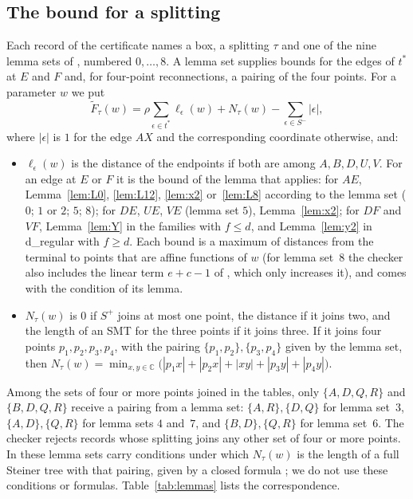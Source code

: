 \documentclass[11pt]{amsart}
\theoremstyle{definition}
\theoremstyle{remark}
\numberwithin{equation}{section}
\begin{document}
\subsection{The bound for a splitting}\label{sec:bound}
Each record of the certificate names a box, a splitting $\tau$ and one of the nine lemma sets of \cite{KHSHGW}, numbered $0,\dots,8$. A lemma set supplies bounds for the edges of $t^*$ at $E$ and $F$ and, for four-point reconnections, a pairing of the four points. For a parameter $w$ we put
\[
\tilde F_\tau(w)=\rho\sum_{\epsilon\in t^*}\ell_\epsilon(w)+N_\tau(w)-\sum_{\epsilon\in S^-}|\epsilon|,
\]
where $|\epsilon|$ is $1$ for the edge $AX$ and the corresponding coordinate otherwise, and:
\begin{itemize}[leftmargin=*]
\item $\ell_\epsilon(w)$ is the distance of the endpoints if both are among $A,B,D,U,V$. For an edge at $E$ or $F$ it is the bound of the lemma that applies: for $AE$, Lemma~\ref{lem:L0}, \ref{lem:L12}, \ref{lem:x2} or~\ref{lem:L8} according to the lemma set ($0$; $1$ or $2$; $5$; $8$); for $DE$, $UE$, $VE$ (lemma set $5$), Lemma~\ref{lem:x2}; for $DF$ and $VF$, Lemma~\ref{lem:Y} in the families with $f\le d$, and Lemma~\ref{lem:y2} in d\_regular with $f\ge d$. Each bound is a maximum of distances from the terminal to points that are affine functions of $w$ (for lemma set~$8$ the checker also includes the linear term $e+c-1$ of \cite[Lemma~36]{KHSHGW}, which only increases it), and comes with the condition of its lemma.
\item $N_\tau(w)$ is $0$ if $S^+$ joins at most one point, the distance if it joins two, and the length of an SMT for the three points if it joins three. If it joins four points $p_1,p_2,p_3,p_4$, with the pairing $\{p_1,p_2\},\{p_3,p_4\}$ given by the lemma set, then $N_\tau(w)=\min_{x,y\in\mathbb C}\bigl(|p_1x|+|p_2x|+|xy|+|p_3y|+|p_4y|\bigr)$.
\end{itemize}
Among the sets of four or more points joined in the tables, only $\{A,D,Q,R\}$ and $\{B,D,Q,R\}$ receive a pairing from a lemma set: $\{A,R\},\{D,Q\}$ for lemma set~$3$, $\{A,D\},\{Q,R\}$ for lemma sets $4$ and~$7$, and $\{B,D\},\{Q,R\}$ for lemma set~$6$. The checker rejects records whose splitting joins any other set of four or more points. In \cite{KHSHGW} these lemma sets carry conditions under which $N_\tau(w)$ is the length of a full Steiner tree with that pairing, given by a closed formula \cite{DHST87}; we do not use these conditions or formulas. Table~\ref{tab:lemmas} lists the correspondence.
\end{document}
